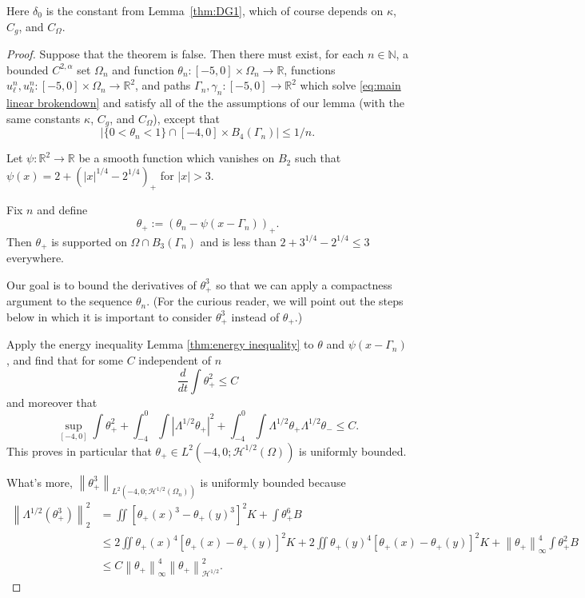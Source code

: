 \documentclass[11pt]{amsart}
\theoremstyle{remark}
\theoremstyle{definition}
\newcommand{\R}{\mathbb{R}}
\newcommand{\N}{\mathbb{N}}
\newcommand{\norm}[1]{\left\lVert#1\right\rVert}
\newcommand{\paren}[1]{\left( #1 \right)}
\newcommand{\abs}[1]{\left\lvert #1 \right\rvert}
\newcommand{\ddt}{\frac{d}{dt}}
\newcommand{\ulow}{u_\ell}
\newcommand{\uhigh}{u_h}
\newcommand{\HD}{\mathcal{H}}
\newcommand{\Cgamma}{C_g}
\newcommand{\Comega}{C_\Omega}
\newcounter{step_count}[section]
\begin{document}
Here $\delta_0$ is the constant from Lemma~\ref{thm:DG1}, which of course depends on $\kappa$, $\Cgamma$, and $\Comega$.  

\begin{proof}
Suppose that the theorem is false.  Then there must exist, for each $n \in \N$, a bounded $C^{2,\alpha}$ set $\Omega_n$ and function $\theta_n: [-5,0]\times \Omega_n \to \R$, functions $\ulow^n, \uhigh^n: [-5,0]\times\Omega_n \to \R^2$, and paths $\Gamma_n,\gamma_n:[-5,0]\to\R^2$ which solve \eqref{eq:main linear brokendown} and satisfy all of the the assumptions of our lemma (with the same constants $\kappa$, $\Cgamma$, and $\Comega$), except that
\begin{equation} \label{mass assumption between} \abs{\{0 < \theta_n < 1\} \cap [-4,0]\times B_4(\Gamma_n)} \leq 1/n. \end{equation}

Let $\psi:\R^2 \to \R$ be a smooth function which vanishes on $B_2$ such that $\psi(x) = 2 + \paren{|x|^{1/4}-2^{1/4}}_+$ for $|x|>3$.  

Fix $n$ and define 
\[ \theta_+ := \paren{\theta_n - \psi(x-\Gamma_n)}_+. \]
Then $\theta_+$ is supported on $\Omega \cap B_3(\Gamma_n)$ and is less than $2 + 3^{1/4} - 2^{1/4} \leq 3$ everywhere.  

Our goal is to bound the derivatives of $\theta_+^3$ so that we can apply a compactness argument to the sequence $\theta_n$.  (For the curious reader, we will point out the steps below in which it is important to consider $\theta_+^3$ instead of $\theta_+$.)  

Apply the energy inequality Lemma \ref{thm:energy inequality} to $\theta$ and $\psi(x-\Gamma_n)$, and find that for some $C$ independent of $n$
\begin{equation} \label{ddt theta bounded} \ddt \int \theta_+^2 \leq C \end{equation}
and moreover that
\begin{equation}\label{DG2 energy} \sup_{[-4,0]} \int \theta_+^2 + \int_{-4}^0 \int \abs{\Lambda^{1/2}\theta_+}^2 + \int_{-4}^0 \int \Lambda^{1/2}\theta_+ \Lambda^{1/2}\theta_- \leq C. \end{equation}
This proves in particular that $\theta_+ \in L^2(-4,0; \HD^{1/2}(\Omega))$ is uniformly bounded.  

What's more, $\norm{\theta_+^3}_{L^2(-4,0;\HD^{1/2}(\Omega_n))}$ is uniformly bounded because
\begin{align*} 
\norm{\Lambda^{1/2}(\theta_+^3)}_2^2 &= \iint [\theta_+(x)^3 - \theta_+(y)^3]^2 K + \int \theta_+^6 B 
\\ &\leq 2\iint \theta_+(x)^4 [\theta_+(x)-\theta_+(y)]^2 K + 2\iint \theta_+(y)^4[\theta_+(x)-\theta_+(y)]^2 K + \norm{\theta_+}_\infty^4 \int \theta_+^2 B
\\ &\leq C \norm{\theta_+}_\infty^4 \norm{\theta_+}_{\HD^{1/2}}^2.  
\end{align*}


\end{proof}
\end{document}
